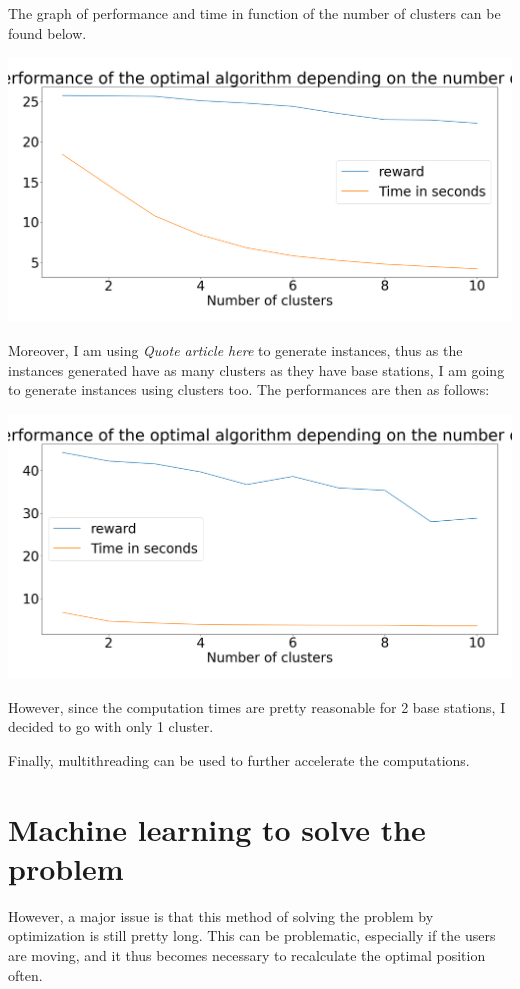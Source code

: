 \documentclass[letterpaper]{article}
\begin{document}
\begin{multicols}{2}
The graph of performance and time in function of the number of clusters can be found below.

\includegraphics[scale=0.15]{images/Performance_opt_function_clusters.png}

Moreover, I am using \textit{Quote article here} to generate instances, thus as the instances generated have as many
clusters as they have base stations, I am going to generate instances using clusters too.
The performances are then as follows:

\includegraphics[scale=0.15]{images/Performance_opt_function_clusters_when_2clusters.png}

However, since the computation times are pretty reasonable for 2 base stations, I decided to go with only 1 cluster.

Finally, multithreading can be used to further accelerate the computations.

\section{Machine learning to solve the problem}

However, a major issue is that this method of solving the problem by optimization is still pretty long.
This can be problematic, especially if the users are moving, and it thus becomes necessary to recalculate the optimal position often.


\end{multicols}
\end{document}
